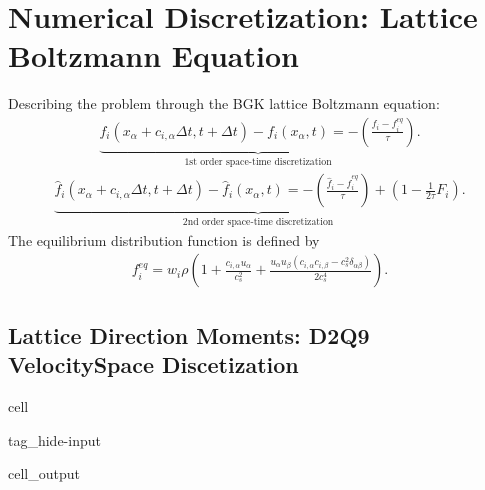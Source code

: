\documentclass[letterpaper,10pt,english,openany,oneside]{jupyterBook}
\begin{document}
\section{Numerical Discretization: Lattice Boltzmann Equation}
\label{\detokenize{Refs/LBM-Study/intro-nse-lbm/Navier-Stokes-Equation:numerical-discretization-lattice-boltzmann-equation}}
\sphinxAtStartPar
Describing the problem through the BGK lattice Boltzmann equation:
\begin{equation}\label{equation:Refs/LBM-Study/intro-nse-lbm/Navier-Stokes-Equation:LB-ns-1st-Eq}
\begin{split}
\underbrace{f_{i}\left(x_{\alpha}+ c_{i,\alpha} \Delta t, t+\Delta t\right)- f_{i}(x_{\alpha}, t)= -\left( \frac{ f_{i} - f_{i}^{eq} }{ \tau} \right) }_{\textrm{1st order space-time discretization}}.
\end{split}
\end{equation}\begin{equation}\label{equation:Refs/LBM-Study/intro-nse-lbm/Navier-Stokes-Equation:LB-ns-2nd-Eq}
\begin{split}
\underbrace{\hat{f}_{i}\left(x_{\alpha}+ c_{i,\alpha} \Delta t, t+\Delta t\right)- \hat{f}_{i}(x_{\alpha}, t)= -\left( \frac{ \hat{f}_{i} - \hat{f}_{i}^{eq} }{ \tau } \right) + \left(1-\frac{1}{2\tau}F_{i} \right) }_{\textrm{2nd order space-time discretization}}.
\end{split}
\end{equation}
\sphinxAtStartPar
The equilibrium distribution function is defined by
\begin{equation*}
\begin{split}
f^{eq}_{i} = w_{i}\rho\left( 1 + \frac{c_{i,\alpha} u_{\alpha}}{c_{s}^{2}} + \frac{  u_{\alpha}u_{\beta}  \left( c_{i,\alpha}c_{i,\beta} - c_{s}^{2}\delta_{\alpha\beta} \right)}{2c_{s}^{4}}  \right).
\end{split}
\end{equation*}

\subsection{Lattice Direction Moments: D2Q9 Velocity\sphinxhyphen{}Space Discetization}
\label{\detokenize{Refs/LBM-Study/intro-nse-lbm/Navier-Stokes-Equation:lattice-direction-moments-d2q9-velocity-space-discetization}}
\begin{sphinxuseclass}{cell}
\begin{sphinxuseclass}{tag_hide-input}\begin{sphinxVerbatimOutput}

\begin{sphinxuseclass}{cell_output}
\noindent{}

\end{sphinxuseclass}\end{sphinxVerbatimOutput}

\end{sphinxuseclass}
\end{sphinxuseclass}
\end{document}

